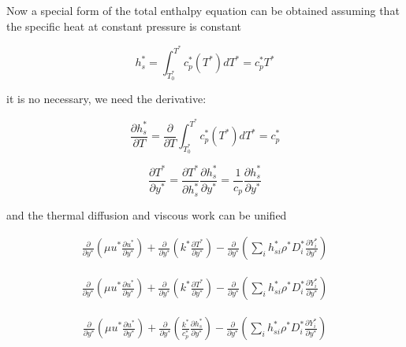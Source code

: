 {\color{red}
Now a special form of the total enthalpy equation can 
be obtained assuming that the specific heat at 
constant pressure is constant 

\begin{equation} 
    h_s^*
    =
    \int_{T_0^*}^{T^*}
    c_p^*(T^*)
    dT^*
    =
    c_p^*
    T^*
\end{equation} 
}
it is no necessary, we need the derivative:

\begin{equation} 
    \frac{\partial h_s^*}{\partial T}
    =
    \frac{\partial }{\partial T}
    \int_{T_0^*}^{T^*}
    c_p^*(T^*)
    dT^*
    =
    c_p^*
\end{equation} 

\begin{equation} 
    \frac{\partial T^*}{\partial y^*}
    =
    \frac{\partial T^*}{\partial h_s^*}
    \frac{\partial h_s^*}{\partial y^*}
    =
    \frac{1}{c_p}
    \frac{\partial h_s^*}{\partial y^*}
\end{equation} 

and the thermal diffusion and viscous work can be 
unified  

\begin{equation*} 
\begin{split} 
\frac{\partial}{\partial y^*}
\left(
    \mu
    u^*
    \frac{\partial u^*}{\partial y^*}
\right)
+
\frac{\partial}{\partial y^*}
\left(
    k^*\frac{\partial T^*}{\partial y^*}
\right)
-
\frac{\partial}{\partial y^*}
\left(
        \sum_i
        h_{si}^*
        \rho^* 
        D_i^*
        \frac{\partial Y_i^*}{\partial y^*}
\right)
\end{split} 
\end{equation*} 


\begin{equation*} 
\begin{split} 
\frac{\partial}{\partial y^*}
\left(
    \mu
    u^*
    \frac{\partial u^*}{\partial y^*}
\right)
+
\frac{\partial}{\partial y^*}
\left(
    k^*\frac{\partial T^*}{\partial y^*}
\right)
-
\frac{\partial}{\partial y^*}
\left(
        \sum_i
        h_{si}^*
        \rho^* 
        D_i^*
        \frac{\partial Y_i^*}{\partial y^*}
\right)
\end{split} 
\end{equation*} 

\begin{equation*} 
\begin{split} 
\frac{\partial}{\partial y^*}
\left(
    \mu
    u^*
    \frac{\partial u^*}{\partial y^*}
\right)
+
\frac{\partial}{\partial y^*}
\left(
    \frac{k^*}{c_p^*}
    \frac{\partial h_s^*}{\partial y^*}
\right)
-
\frac{\partial}{\partial y^*}
\left(
        \sum_i
        h_{si}^*
        \rho^* 
        D_i^*
        \frac{\partial Y_i^*}{\partial y^*}
\right)
\end{split} 
\end{equation*} 

